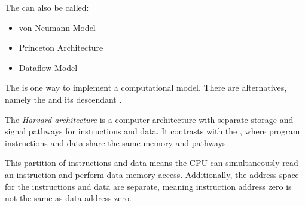 \begin{definition}
  \begin{remark}\label{rmk:von_Neumann_Architecture_Alternative_Names}
    The  can also be called:
    \begin{itemize}[noitemsep]
    \item von Neumann Model
    \item Princeton Architecture
    \item Dataflow Model
    \end{itemize}
  \end{remark}

  \begin{remark}\label{rmk:von_Neumann_Architecture_Alternatives}
    The  is one way to implement a computational model.
    There are alternatives, namely the  and its descendant .
  \end{remark}
\end{definition}

\begin{definition}\label{def:Harvard_Architecture}
  The \emph{Harvard architecture} is a computer architecture with separate storage and signal pathways for instructions and data.
  It contrasts with the , where program instructions and data share the same memory and pathways.

  This partition of instructions and data means the CPU can simultaneously read an instruction and perform data memory access.
  Additionally, the address space for the instructions and data are separate, meaning instruction address zero is not the same as data address zero.
\end{definition}

